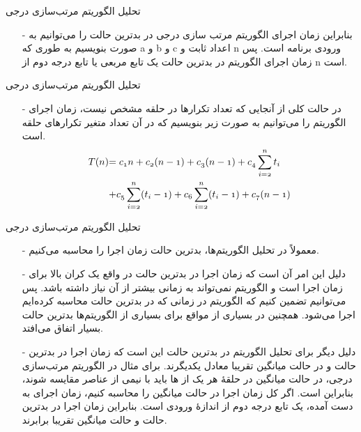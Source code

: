 \begin{frame}{‌تحلیل الگوریتم‌ مرتب‌سازی درجی}
\begin{itemize}\itemr
\item[-]
بنابراین زمان اجرای الگوریتم مرتب سازی درجی در بدترین حالت را می‌توانیم به صورت
بنویسیم به طوری که a و b و c اعداد ثابت و n ورودی برنامه است. پس زمان اجرای الگوریتم در بدترین حالت یک تابع مربعی
یا تابع درجه دوم از n است.
\end{itemize}
\end{frame}


\begin{frame}{‌تحلیل الگوریتم‌ مرتب‌سازی درجی}
\begin{itemize}\itemr
\item[-]
در حالت کلی از آنجایی که تعداد تکرارها در حلقه
مشخص نیست، زمان اجرای الگوریتم را می‌توانیم به صورت زیر بنویسیم که در آن
تعداد متغیر تکرارهای حلقه
است.
\begin{align*}
\mathnormal{T(n)} &\mathnormal{= c_1n + c_2(n-1) + c_3(n-1) + c_4 \sum_{i = 2}^{n} t_i }\\
&\mathnormal{+  c_5 \sum_{i = 2}^{n} (t_i-1) +  c_6 \sum_{i = 2}^{n} (t_i-1) + c_7(n-1)}
\end{align*}
\end{itemize}
\end{frame}


\begin{frame}{‌تحلیل الگوریتم‌ مرتب‌سازی درجی}
\begin{itemize}\itemr
\item[-]
معمولاً در تحلیل  الگوریتم‌ها، بدترین حالت
زمان اجرا را محاسبه می‌کنیم.
\item[-]
دلیل این امر آن است که زمان اجرا در بدترین حالت در واقع یک کران بالا
برای زمان اجرا است و الگوریتم نمی‌تواند به زمانی بیشتر از آن نیاز داشته باشد. پس می‌توانیم تضمین کنیم که الگوریتم در زمانی که در بدترین حالت محاسبه کرده‌ایم اجرا می‌شود. همچنین در بسیاری از مواقع برای بسیاری از الگوریتم‌ها بدترین حالت بسیار اتفاق می‌افتد.
\item[-]
دلیل دیگر برای تحلیل الگوریتم در بدترین حالت این است که زمان اجرا در بدترین حالت و در حالت میانگین
تقریبا معادل یکدیگرند. برای مثال در الگوریتم مرتب‌سازی درجی، در حالت میانگین در حلقهٔ
هر یک از
ها باید با نیمی از عناصر
مقایسه شوند، بنابراین
است.
اگر کل زمان اجرا در حالت میانگین را محاسبه کنیم، زمان اجرای به دست آمده، یک تابع درجه دوم از اندازهٔ ورودی است. بنابراین زمان اجرا در بدترین حالت و حالت میانگین تقریبا برابرند.
\end{itemize}
\end{frame}



